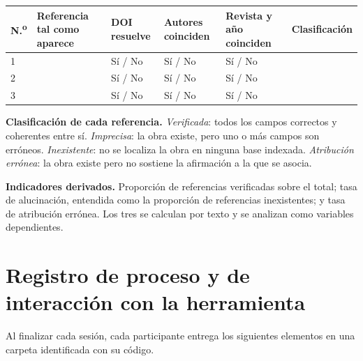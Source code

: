 \documentclass[12pt,a4paper,openany]{report}
\begin{document}
    \begin{table}[htbp]
        \centering
        \footnotesize
        \begin{tabular}{C{0.8cm} L{4.2cm} C{1.6cm} C{1.7cm} C{1.9cm} C{2.1cm}}
            \toprule
            \textbf{N.\textsuperscript{o}} & \textbf{Referencia tal como aparece} & \textbf{DOI resuelve} & \textbf{Autores coinciden} & \textbf{Revista y a\~no coinciden} & \textbf{Clasificaci\'on} \\
             & & S\'i / No & S\'i / No & S\'i / No & \\
            2 & & S\'i / No & S\'i / No & S\'i / No & \\
            3 & & S\'i / No & S\'i / No & S\'i / No & \\
            \bottomrule
        \end{tabular}
    \end{table}
    
    \textbf{Clasificaci\'on de cada referencia.} \emph{Verificada}: todos los campos correctos y coherentes entre s\'i. \emph{Imprecisa}: la obra existe, pero uno o m\'as campos son err\'oneos. \emph{Inexistente}: no se localiza la obra en ninguna base indexada. \emph{Atribuci\'on err\'onea}: la obra existe pero no sostiene la afirmaci\'on a la que se asocia.
    
    \textbf{Indicadores derivados.} Proporci\'on de referencias verificadas sobre el total; tasa de alucinaci\'on, entendida como la proporci\'on de referencias inexistentes; y tasa de atribuci\'on err\'onea. Los tres se calculan por texto y se analizan como variables dependientes.
    
    \chapter{Registro de proceso y de interacci\'on con la herramienta}
    \label{anx:proceso}
    
    Al finalizar cada sesi\'on, cada participante entrega los siguientes elementos en una carpeta identificada con su c\'odigo.
    
\end{document}

